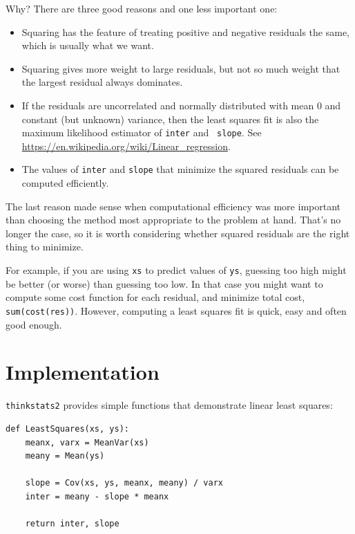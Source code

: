 \documentclass[12pt]{book}
\begin{document}
Why?  There are three good reasons and one less important one:

\begin{itemize}

\item Squaring has the feature of treating positive and
negative residuals the same, which is usually what we want.

\item Squaring gives more weight to large residuals, but not
so much weight that the largest residual always dominates.

\item If the residuals are uncorrelated and normally distributed with
  mean 0 and constant (but unknown) variance, then the least squares
  fit is also the maximum likelihood estimator of {\tt inter} and {\tt
    slope}.  See
  \url{https://en.wikipedia.org/wiki/Linear_regression}.  

\item The values of {\tt inter} and {\tt slope} that minimize
  the squared residuals can be computed efficiently.

\end{itemize}

The last reason made sense when computational efficiency was more
important than choosing the method most appropriate to the problem
at hand.  That's no longer the case, so it is worth considering
whether squared residuals are the right thing to minimize.

For example, if you are using {\tt xs} to predict values of {\tt ys},
guessing too high might be better (or worse) than guessing too low.
In that case you might want to compute some cost function for each
residual, and minimize total cost, {\tt sum(cost(res))}.
However, computing a least squares fit is quick, easy and often good
enough.  


\section{Implementation}

{\tt thinkstats2} provides simple functions that demonstrate
linear least squares:

\begin{verbatim}
def LeastSquares(xs, ys):
    meanx, varx = MeanVar(xs)
    meany = Mean(ys)

    slope = Cov(xs, ys, meanx, meany) / varx
    inter = meany - slope * meanx

    return inter, slope
\end{verbatim}
\end{document}
